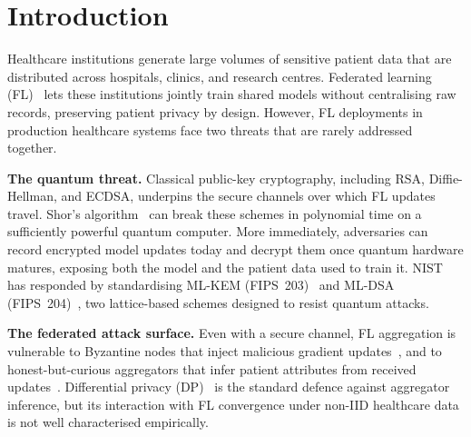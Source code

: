 \documentclass[runningheads]{llncs}
\begin{document}

\section{Introduction}
\label{sec:intro}

Healthcare institutions generate large volumes of sensitive patient
data that are distributed across hospitals, clinics, and research
centres.
Federated learning (FL)~\cite{mcmahan2017} lets these institutions
jointly train shared models without centralising raw records,
preserving patient privacy by design.
However, FL deployments in production healthcare systems face two
threats that are rarely addressed together.

\textbf{The quantum threat.}
Classical public-key cryptography, including RSA, Diffie-Hellman, and
ECDSA, underpins the secure channels over which FL updates travel.
Shor's algorithm~\cite{shor1994} can break these schemes in polynomial
time on a sufficiently powerful quantum computer.
More immediately, adversaries can record encrypted model updates today
and decrypt them once quantum hardware matures, exposing both the
model and the patient data used to train it.
NIST has responded by standardising ML-KEM (FIPS~203)~\cite{nistfips203}
and ML-DSA (FIPS~204)~\cite{nistfips204}, two lattice-based schemes
designed to resist quantum attacks.

\textbf{The federated attack surface.}
Even with a secure channel, FL aggregation is vulnerable to Byzantine
nodes that inject malicious gradient updates~\cite{blanchard2017}, and
to honest-but-curious aggregators that infer patient attributes from
received updates~\cite{geiping2020}.
Differential privacy (DP)~\cite{dwork2006} is the standard defence
against aggregator inference, but its interaction with FL convergence
under non-IID healthcare data is not well characterised empirically.
\end{document}
